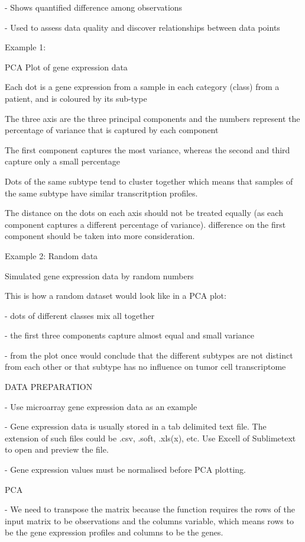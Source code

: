 \documentclass[11pt, oneside]{article}   	%
\begin{document}
- Shows quantified difference among observations

- Used to assess data quality and discover relationships between data points


Example 1:

PCA Plot of gene expression data 

Each dot is a gene expression from a sample in each category (class) from a patient, and is coloured by its sub-type

The three axis are the three principal components 
and the numbers represent the percentage of variance that is captured by each component

The first component captures the most variance, whereas the second and third capture only a small percentage

Dots of the same subtype tend to cluster together which means that samples of the same subtype have similar transcritption profiles.


The distance on the dots on each axis should not be treated equally (as each component captures a different percentage of variance). difference on the first component should be taken into more consideration.



Example 2: Random data

Simulated gene expression data by random numbers

This is how a random dataset would look like in a PCA plot:

- dots of different classes mix all together

- the first three components capture almost equal and small variance

- from the plot once would conclude that the different subtypes are not distinct from each other or that subtype has no influence on tumor cell transcriptome



DATA PREPARATION

- Use microarray gene expression data as an example

- Gene expression data is usually stored in a tab delimited text file. The extension of such files could be .csv, .soft, .xls(x), etc. Use Excell of Sublimetext to open and preview the file.

- Gene expression values must be normalised before PCA plotting.


PCA

- We need to transpose the matrix because the function requires the rows of the input matrix to be observations and the columns variable, which means rows to be the gene expression profiles and columns to be the genes.
\end{document}
